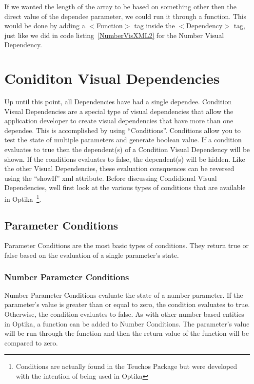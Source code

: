 If we wanted the length of the array to be based on something other then the direct value of the dependee parameter, we could run it through a function. This would 
be done by adding a $<$Function$>$ tag inside the $<$Dependency$>$ tag, just like we did in code listing~\ref{NumberVisXML2} for the Number Visual Dependency.

\section{Coniditon Visual Dependencies}
Up until this point, all Dependencies have had a single dependee. Condition Visual Dependencies are a special type of visual dependencies that allow the application developer to
create visual dependencies that have more than one dependee. This is accomplished by using ``Conditions''. Conditions allow you to test the state of multiple parameters and 
generate boolean value. If a condition evaluates to true then the dependent(s) of a Condition Visual Dependency will be shown. If the conditions evaluates to false, the 
dependent(s) will be hidden. Like the other Visual Dependencies, these evaluation consquences can be reversed using the ``showIf'' xml attribute.  Before discussing Condidional 
Visual Dependencies, well first look at the various types of conditions that are available in Optika~\footnote{Conditions are actually found in the Teuchos Package but were 
developed with the intention of being used in Optika}.

\subsection{Parameter Conditions}
Parameter Conditions are the most basic types of conditions. They return true or false based on the evaluation of a single parameter's state.

\subsubsection{Number Parameter Conditions}
Number Parameter Conditions evaluate the state of a number parameter. If the parameter's value is greater than or equal to zero, the condition evaluates to true. Otherwise, the 
condition evaluates to false.  As with other number based entities in Optika, a function can be added to Number Conditions. The parameter's value will be run through the 
function and then the return value of the function will be compared to zero.

